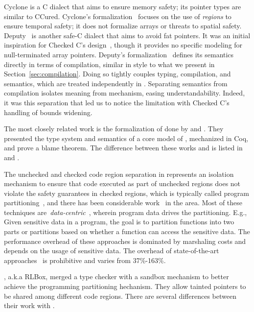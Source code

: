 Cyclone \cite{Jim2002,GrossmanMJHWC02} is a C dialect that aims to
ensure memory safety; its pointer types are similar to
CCured. Cyclone's formalization~\cite{GrossmanMJHWC02} focuses on the
use of \emph{regions} to ensure temporal safety; it does not formalize
arrays or threats to spatial safety. Deputy~\cite{Feng2006,Condit2007}
is another safe-C dialect that aims to avoid fat pointers. It was an
initial inspiration for Checked C's design~\cite{Elliott2018}, though
it provides no specific modeling for null-terminated array
pointers. Deputy's formalization~\cite{Condit2007} defines its
semantics directly in terms of compilation, similar in style to what
we present in Section~\ref{sec:compilation}. Doing so tightly couples
typing, compilation, and semantics, which are treated independently in
\lang. Separating semantics from compilation isolates meaning 
from mechanism, easing understandability. Indeed, it was this
separation that led us to notice the 
limitation with Checked C's handling of bounds widening.

The most closely related work is the
formalization of \checkedc done by \citet{ruef18checkedc-incr} and \citet{li22checkedc}. They
presented the type system and semantics of a core model of \checkedc,
mechanized in Coq, and prove a blame theorem. 
The difference between these works and \systemname is listed in  and .

%
The unchecked and checked code region separation in \systemname represents an isolation mechanism to ensure that code executed as part of unchecked regions does not violate the safety guarantees in checked regions,
which is typically called program partitioning~\cite{rul2009towards}, and there has been considerable work~\cite{tan2017principles, brumley2004privtrans, bittau2008wedge, lind2017glamdring, liu2017ptrsplit} in the area. Most of these techniques are~\emph{data-centric}~\cite{lind2017glamdring, liu2017ptrsplit}, wherein program data drives the partitioning. E.g., Given sensitive data in a program, the goal is to partition functions into two parts or partitions based on whether a function can access the sensitive data.
The performance overhead of these approaches is dominated by marshaling costs and depends on the usage of sensitive data.
The overhead of state-of-the-art approaches~\cite{lind2017glamdring, liu2017ptrsplit} is prohibitive and varies from 37\%-163\%.

\citet{rlbox-paper}, a.k.a RLBox, merged a type checker with a sandbox mechanism to better achieve the programming partitioning hechanism.
They allow tainted pointers to be shared among different code regions. There are several differences between their work with \systemname.


